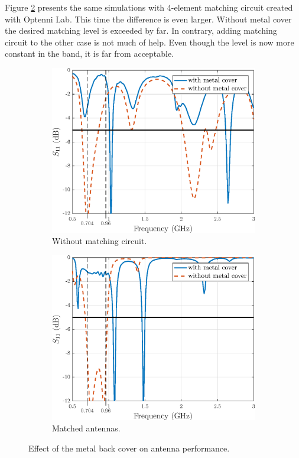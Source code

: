 Figure \ref{fig:metal_vs_nometal_matched} presents the same simulations with 4-element matching circuit created with Optenni Lab. This time the difference is even larger. Without metal cover the desired matching level is exceeded by far. In contrary, adding matching circuit to the other case is not much of help. Even though the level is now more constant in the band, it is far from acceptable.

\begin{figure}[H]
    \centering 
    \begin{subfigure}[b]{0.49\textwidth}
        \includegraphics[width=\textwidth]{img/metal_vs_nometal.eps}
        \caption{Without matching circuit.}
        \label{fig:metal_vs_nometal}
    \end{subfigure}
    \begin{subfigure}[b]{0.49\textwidth}
        \includegraphics[width=\textwidth]{img/metal_vs_nometal_matched.eps}
        \caption{Matched antennas.}
        \label{fig:metal_vs_nometal_matched}
    \end{subfigure}
    \caption{Effect of the metal back cover on antenna performance.}
    \label{fig:metal_vs_nometal_results}
\end{figure}

